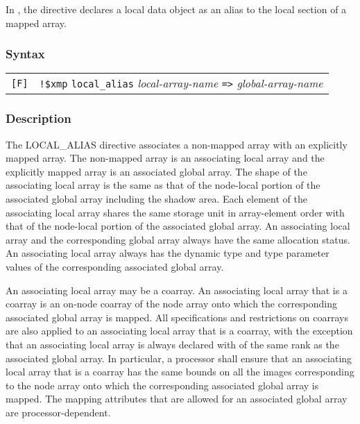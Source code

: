 In {\XMPF}, the {\tt {}} directive declares a
local data object as an alias to the local section of a mapped
array.

\subsubsection*{Syntax}

\begin{tabular}{ll}
\verb![F]! & \verb|!$xmp| {\tt local\_alias} {\it local-array-name}
\verb|=>| {\it global-array-name} \\
\end{tabular}

\subsubsection*{Description}

The LOCAL\_ALIAS directive associates a non-mapped array with
an explicitly mapped array.
The non-mapped array is an associating local array and
the explicitly mapped array is an associated global array.
The shape of the associating local array is the same as
that of the node-local portion of the associated global array
including the shadow area.
Each element of the associating local array shares the 
same storage unit in array-element order with that of the node-local portion 
of the associated global array.
An associating local array and the corresponding global array always have
the same allocation status.
An associating local array always has the dynamic type
and type parameter values of the corresponding 
associated global array.



An associating local array may be a coarray.
An associating local array that is a coarray is
an on-node coarray of the node array onto which the corresponding
associated global array is mapped.
All specifications and restrictions on coarrays are also applied to an associating local
array that is a coarray, with the exception that
an associating local array is always declared with
 of the same rank as the associated global array.
In particular, a processor shall ensure that an associating local array 
that is a coarray has
the same bounds on all the images corresponding to the node array
onto which the corresponding associated global array is mapped.
The mapping attributes that are allowed for an associated global array are
processor-dependent.

